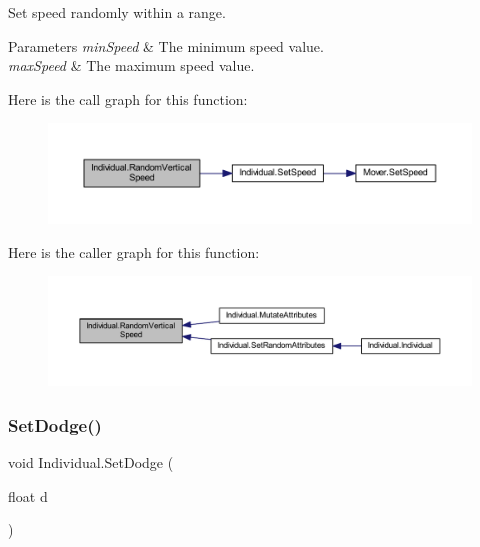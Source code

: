 Set speed randomly within a range. 


\begin{DoxyParams}{Parameters}
{\em min\+Speed} & The minimum speed value.\\
\hline
{\em max\+Speed} & The maximum speed value.\\
\hline
\end{DoxyParams}
Here is the call graph for this function\+:\nopagebreak
\begin{figure}[H]
\begin{center}
\leavevmode
\includegraphics[width=350pt]{class_individual_ab66822b58148ba1507d2e27aff8676e7_cgraph}
\end{center}
\end{figure}
Here is the caller graph for this function\+:\nopagebreak
\begin{figure}[H]
\begin{center}
\leavevmode
\includegraphics[width=350pt]{class_individual_ab66822b58148ba1507d2e27aff8676e7_icgraph}
\end{center}
\end{figure}
\mbox{\label{class_individual_a31b0b7114a58803aba9e81b6650fd7cb}} 
\subsubsection{\texorpdfstring{Set\+Dodge()}{SetDodge()}}
{\footnotesize\ttfamily void Individual.\+Set\+Dodge (\begin{DoxyParamCaption}\item[{float}]{d }\end{DoxyParamCaption})}



